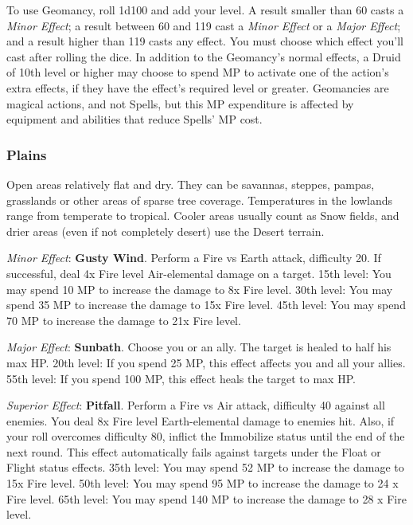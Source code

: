 
    To use Geomancy, roll 1d100 and add your level. A result smaller than 60 casts a \textit{Minor Effect}; a 
result between 60 and 119 cast a \textit{Minor Effect} or a \textit{Major Effect}; and a result higher than 119 casts any effect. 
You must choose which effect you'll cast after rolling the dice. In addition to the Geomancy’s normal 
effects, a Druid of 10th level or higher may choose to spend MP to activate one of the action’s extra effects, 
if they have the effect’s required level or greater. Geomancies are magical actions, and not Spells, but this 
MP expenditure is affected by equipment and abilities that reduce Spells’ MP cost.

\begin{multicols}{2}

	\subsubsection{Plains}
	
    Open areas relatively flat and dry. They can 
be savannas, steppes, pampas, grasslands or other
areas of sparse tree coverage. Temperatures in the 
lowlands range from temperate to tropical. Cooler 
areas usually count as Snow fields, and drier areas 
(even if not completely desert) use the Desert 
terrain.

    \textit{Minor Effect}: \textbf{Gusty Wind}. Perform a Fire 
vs Earth attack, difficulty 20. If successful, deal 4x 
Fire level Air-elemental damage on a target. 15th 
level: You may spend 10 MP to increase the 
damage to 8x Fire level. 30th level: You may spend 
35 MP to increase the damage to 15x Fire level. 
45th level: You may spend 70 MP to increase the 
damage to 21x Fire level.

\textit{Major Effect}: \textbf{Sunbath}. Choose you or an 
ally. The target is healed to half his max HP. 20th 
level: If you spend 25 MP, this effect affects you and 
all your allies. 55th level: If you spend 100 MP, this 
effect heals the target to max HP.

\textit{Superior Effect}: \textbf{Pitfall}. Perform a Fire vs 
Air attack, difficulty 40 against all enemies. You 
deal 8x Fire level Earth-elemental damage to 
enemies hit. Also, if your roll overcomes difficulty 
80, inflict the Immobilize status until the end of 
the next round. This effect automatically fails 
against targets under the Float or Flight status 
effects. 35th level: You may spend 52 MP to increase 
the damage to 15x Fire level. 50th level: You may 
spend 95 MP to increase the damage to 24 x Fire 
level. 65th level: You may spend 140 MP to increase 
the damage to 28 x Fire level.


\end{multicols}
